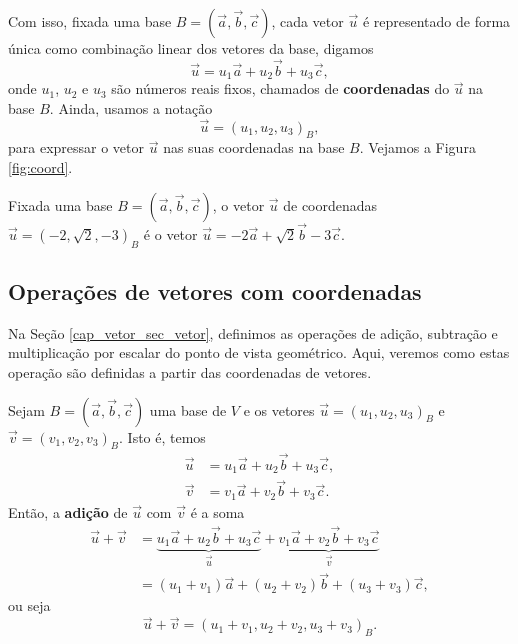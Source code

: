 Com isso, fixada uma base $B = (\vec{a}, \vec{b}, \vec{c})$, cada vetor $\vec{u}$ é representado de forma única como combinação linear dos vetores da base, digamos
\begin{equation}
  \vec{u} = u_1\vec{a} + u_2\vec{b} + u_3\vec{c},
\end{equation}
onde $u_1$, $u_2$ e $u_3$ são números reais fixos, chamados de {\bf coordenadas} do $\vec{u}$ na base $B$. Ainda, usamos a notação
\begin{equation}
  \vec{u} = (u_1, u_2, u_3)_B,
\end{equation}
para expressar o vetor $\vec{u}$ nas suas coordenadas na base $B$. Vejamos a Figura \ref{fig:coord}.

\begin{ex}
  Fixada uma base $B = (\vec{a}, \vec{b}, \vec{c})$, o vetor $\vec{u}$ de coordenadas $\vec{u}=(-2,\sqrt{2},-3)_B$ é o vetor $\vec{u} = -2\vec{a} + \sqrt{2}\vec{b} - 3\vec{c}$.
\end{ex}

\subsection{Operações de vetores com coordenadas}


Na Seção \ref{cap_vetor_sec_vetor}, definimos as operações de adição, subtração e multiplicação por escalar do ponto de vista geométrico. Aqui, veremos como estas operação são definidas a partir das coordenadas de vetores.

Sejam $B = (\vec{a}, \vec{b}, \vec{c})$ uma base de $V$ e os vetores $\vec{u} = (u_1, u_2, u_3)_B$ e $\vec{v} = (v_1, v_2, v_3)_B$. Isto é, temos
\begin{align}
  \vec{u} &= u_1\vec{a} + u_2\vec{b} + u_3\vec{c},\\
  \vec{v} &= v_1\vec{a} + v_2\vec{b} + v_3\vec{c}.
\end{align}
Então, a {\bf adição} de $\vec{u}$ com $\vec{v}$ é a soma
\begin{align}
  \vec{u}+\vec{v} &= \underbrace{u_1\vec{a} + u_2\vec{b} + u_3\vec{c}}_{\vec{u}} + \underbrace{v_1\vec{a} + v_2\vec{b} + v_3\vec{c}}_{\vec{v}}\\
  &= (u_1+v_1)\vec{a} + (u_2+v_2)\vec{b} + (u_3+v_3)\vec{c},
\end{align}
ou seja
\begin{equation}
  \vec{u}+\vec{v}=(u_1+v_1, u_2+v_2, u_3+v_3)_B.
\end{equation}

